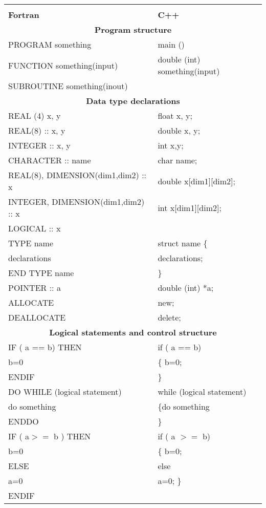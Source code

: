 \begin{table}[hbtp]
\label{tab:intr-tab1}
\begin{tabular}{ll}\hline\hline\\
{\bf Fortran } & {\bf C++}\\ \hline
\multicolumn{2}{c}{{\bf Program structure}}\\
PROGRAM something & main ()\\
FUNCTION something(input) & double (int) something(input)\\
SUBROUTINE something(inout)\\
\multicolumn{2}{c}{{\bf Data type declarations} }\\
REAL (4) x, y & float x, y;\\
REAL(8) :: x, y & double x, y;\\
INTEGER :: x, y & int x,y;\\
CHARACTER :: name & char name;\\
REAL(8), DIMENSION(dim1,dim2) :: x& double x[dim1][dim2];\\
INTEGER, DIMENSION(dim1,dim2) :: x& int x[dim1][dim2];\\
LOGICAL :: x\\  \hline
TYPE name &   struct name \{ \\
declarations   & declarations;\\
END TYPE name & \}\\ \hline
POINTER :: a&   double (int)  *a;\\
ALLOCATE & new;\\
DEALLOCATE & delete;\\\hline
\multicolumn{2}{c}{{\bf Logical statements and control structure}}\\
IF ( a == b) THEN&   if ( a == b) \\
   b=0  &    \{ b=0;\\
ENDIF   &           \}\\ \hline
DO WHILE (logical statement) &  while (logical statement) \\
do something   &               \{do something \\
ENDDO          &                \}\\  \hline
IF ( a$ >=$ b ) THEN &         if ( a $>=$ b) \\
 b=0   &                      \{  b=0;\\
ELSE  &                       else \\
a=0 &                         a=0; \}\\
ENDIF & \\\hline

\end{tabular}
\end{table}

